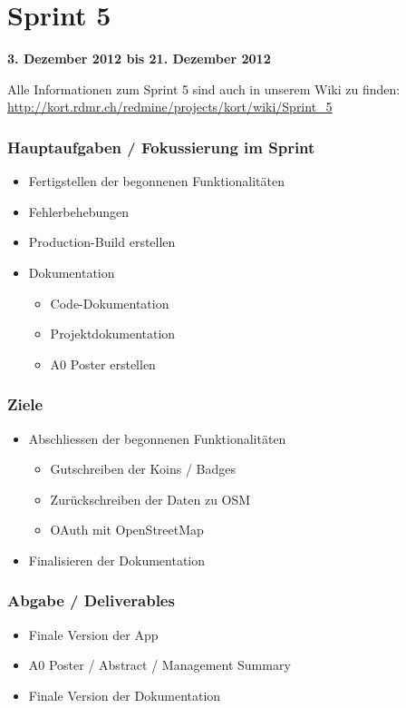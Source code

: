 \section{Sprint 5}

\textbf{3. Dezember 2012 bis 21. Dezember 2012}

Alle Informationen zum Sprint 5 sind auch in unserem Wiki zu finden:
\url{http://kort.rdmr.ch/redmine/projects/kort/wiki/Sprint_5}

\subsubsection{Hauptaufgaben / Fokussierung im Sprint}

\begin{itemize}
	\item Fertigstellen der begonnenen Funktionalitäten
	\item Fehlerbehebungen
	\item Production-Build erstellen
	\item Dokumentation
	\begin{itemize}
		\item Code-Dokumentation
		\item Projektdokumentation
		\item A0 Poster erstellen
	\end{itemize}
\end{itemize}

\subsubsection{Ziele}
\begin{itemize}
	\item Abschliessen der begonnenen Funktionalitäten
	\begin{itemize}
		\item Gutschreiben der Koins / Badges
		\item Zurückschreiben der Daten zu OSM
		\item OAuth mit OpenStreetMap
	\end{itemize}
	\item Finalisieren der Dokumentation
\end{itemize}

\subsubsection{Abgabe / Deliverables}

\begin{itemize}
	\item Finale Version der App
	\item A0 Poster / Abstract / Management Summary
	\item Finale Version der Dokumentation
\end{itemize}

